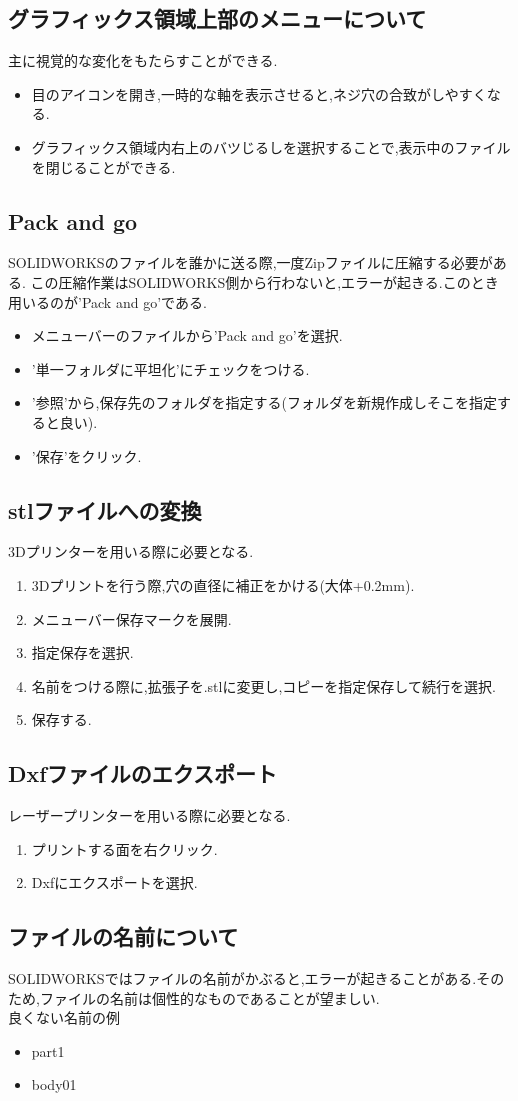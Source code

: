 \documentclass[a4paper,11pt]{jsarticle}
\begin{document}
\subsection{グラフィックス領域上部のメニューについて}
主に視覚的な変化をもたらすことができる.
\begin{itemize}
 \item 目のアイコンを開き,一時的な軸を表示させると,ネジ穴の合致がしやすくなる.
 \item グラフィックス領域内右上のバツじるしを選択することで,表示中のファイルを閉じることができる.
\end{itemize}
\subsection{Pack and go}
SOLIDWORKSのファイルを誰かに送る際,一度Zipファイルに圧縮する必要がある.
この圧縮作業はSOLIDWORKS側から行わないと,エラーが起きる.このとき用いるのが'Pack and go'である.
\begin{itemize}
 \item メニューバーのファイルから'Pack and go'を選択.
 \item '単一フォルダに平坦化'にチェックをつける.
 \item '参照'から,保存先のフォルダを指定する(フォルダを新規作成しそこを指定すると良い).
 \item '保存'をクリック.
\end{itemize}
\subsection{stlファイルへの変換}
3Dプリンターを用いる際に必要となる.
\begin{enumerate}
 \item 3Dプリントを行う際,穴の直径に補正をかける(大体+0.2mm).
 \item メニューバー保存マークを展開.
 \item 指定保存を選択.
 \item 名前をつける際に,拡張子を.stlに変更し,コピーを指定保存して続行を選択.
 \item 保存する.
\end{enumerate}
\subsection{Dxfファイルのエクスポート}
レーザープリンターを用いる際に必要となる.
\begin{enumerate}
 \item プリントする面を右クリック.
 \item Dxfにエクスポートを選択.
\end{enumerate}
\subsection{ファイルの名前について}
SOLIDWORKSではファイルの名前がかぶると,エラーが起きることがある.そのため,ファイルの名前は個性的なものであることが望ましい.\\
良くない名前の例
\begin{itemize}
 \item part1
 \item body01
\end{itemize}
\end{document}
